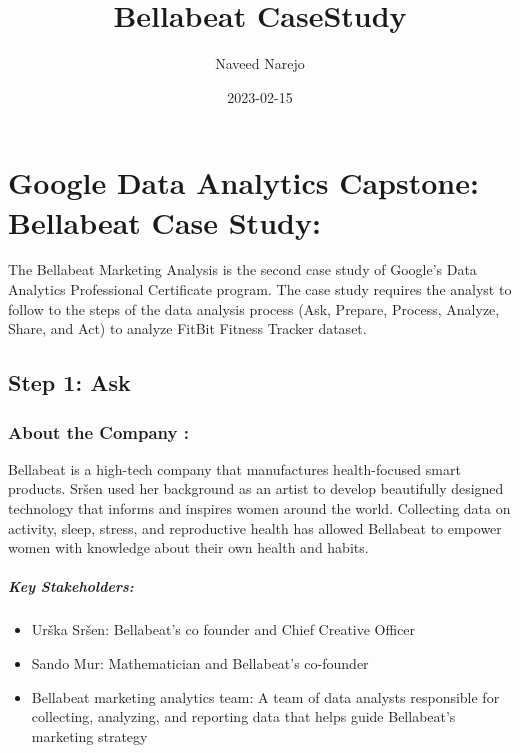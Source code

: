 \documentclass[
]{article}
\title{Bellabeat CaseStudy}
\author{Naveed Narejo}
\date{2023-02-15}
\providecommand{\tightlist}{%
  \setlength{\itemsep}{0pt}\setlength{\parskip}{0pt}}
\begin{document}
\maketitle

\hypertarget{google-data-analytics-capstone-bellabeat-case-study}{%
\section{Google Data Analytics Capstone: Bellabeat Case
Study:}\label{google-data-analytics-capstone-bellabeat-case-study}}

The Bellabeat Marketing Analysis is the second case study of Google's
Data Analytics Professional Certificate program. The case study requires
the analyst to follow to the steps of the data analysis process (Ask,
Prepare, Process, Analyze, Share, and Act) to analyze FitBit Fitness
Tracker dataset.

\hypertarget{step-1-ask}{%
\subsection{Step 1: Ask}\label{step-1-ask}}

\hypertarget{about-the-company}{%
\subsubsection{About the Company :}\label{about-the-company}}

Bellabeat is a high-tech company that manufactures health-focused smart
products. Sršen used her background as an artist to develop beautifully
designed technology that informs and inspires women around the world.
Collecting data on activity, sleep, stress, and reproductive health has
allowed Bellabeat to empower women with knowledge about their own health
and habits.

\hypertarget{key-stakeholders}{%
\subparagraph{Key Stakeholders:}\label{key-stakeholders}}

\begin{itemize}
\tightlist
\item
  Urška Sršen: Bellabeat's co founder and Chief Creative Officer
\item
  Sando Mur: Mathematician and Bellabeat's co-founder
\item
  Bellabeat marketing analytics team: A team of data analysts
  responsible for collecting, analyzing, and reporting data that helps
  guide Bellabeat's marketing strategy
\end{itemize}
\end{document}
